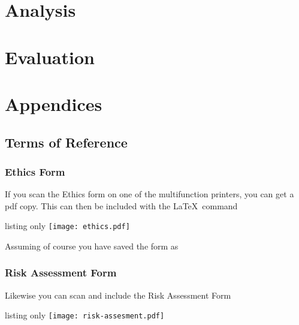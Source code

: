 \documentclass[12pt,twoside]{book}
\begin{document}
\frontmatter




\tableofcontents

\mainmatter

\part{Analysis}


\part{Evaluation}





\part{Appendices}
\appendix

\chapter{Terms of Reference}

\section{Ethics Form}
If you scan the Ethics form on one of the multifunction printers, you can get a pdf copy.  This can then be included with the \LaTeX\ command
\begin{tcblisting}{listing only}
\texttt{[image: ethics.pdf]}
\end{tcblisting}
Assuming of course you have saved the form  as 

\section{Risk Assessment Form}
Likewise you can scan and include the Risk Assessment Form
\begin{tcblisting}{listing only}
\texttt{[image: risk-assesment.pdf]}
\end{tcblisting}
\end{document}
